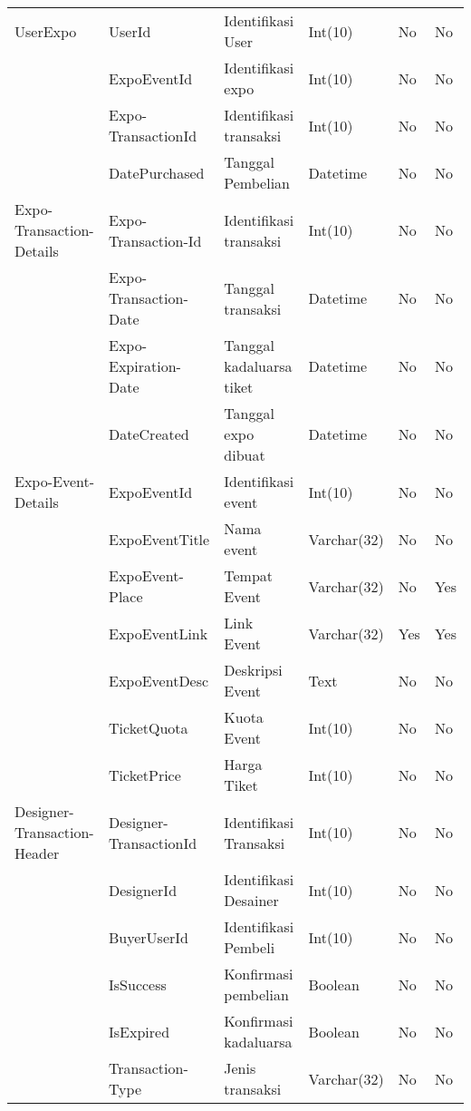 \begin{longtable}{| p{2.2cm} | p{2.5cm} | p{3.4cm} | p{2.2cm} | l | p{1.3cm} |}
		UserExpo	& UserId			& Identifikasi User			& Int(10)	& No & No \\
					& ExpoEventId		& Identifikasi expo			& Int(10)	& No & No \\
					& Expo-TransactionId	& Identifikasi transaksi	& Int(10)	& No & No \\
					& DatePurchased		& Tanggal Pembelian			& Datetime	& No & No \\ \hline
		
		Expo-Transaction-Details	& Expo-Transaction-Id		& Identifikasi transaksi	& Int(10)	& No & No \\
								& Expo-Transaction-Date	& Tanggal transaksi			& Datetime	& No & No \\
								& Expo-Expiration-Date	& Tanggal kadaluarsa tiket	& Datetime	& No & No \\
								& DateCreated			& Tanggal expo dibuat		& Datetime	& No & No \\ \hline
								
		Expo-Event-Details	& ExpoEventId		& Identifikasi event	& Int(10)		& No  & No \\
							& ExpoEventTitle	& Nama event			& Varchar(32)	& No  & No \\
							& ExpoEvent-Place	& Tempat Event			& Varchar(32)	& No  & Yes \\
							& ExpoEventLink		& Link Event			& Varchar(32)	& Yes & Yes \\
							& ExpoEventDesc		& Deskripsi Event		& Text			& No  & No \\
							& TicketQuota		& Kuota Event			& Int(10)		& No  & No \\
							& TicketPrice		& Harga Tiket			& Int(10)		& No  & No \\ \hline
							
		Designer-Transaction-Header	& Designer-TransactionId	& Identifikasi Transaksi	& Int(10)		& No & No \\
									& DesignerId			& Identifikasi Desainer		& Int(10)		& No & No \\
									& BuyerUserId			& Identifikasi Pembeli		& Int(10)		& No & No \\
									& IsSuccess				& Konfirmasi pembelian		& Boolean		& No & No \\
									& IsExpired				& Konfirmasi kadaluarsa		& Boolean		& No & No \\
									& Transaction-Type		& Jenis transaksi			& Varchar(32)	& No & No \\ \hline
									

\end{longtable}
